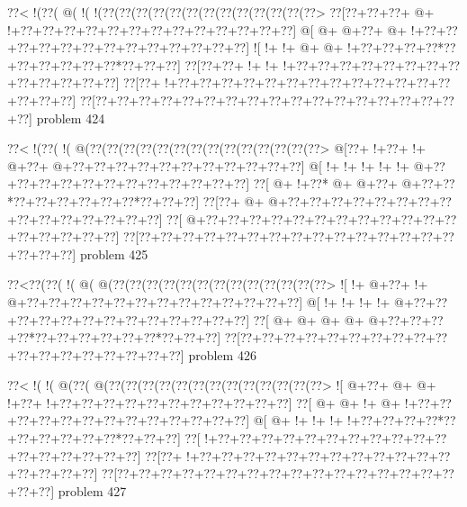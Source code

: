 \vbox{\vbox{\goo
\0??<\- !(\0??(\- @(\- !(\- !(\0??(\0??(\0??(\0??(\0??(\0??(\0??(\0??(\0??(\0??(\0??(\0??(\0??>
\0??[\0??+\0??+\0??+\- @+\- !+\0??+\0??+\0??+\0??+\0??+\0??+\0??+\0??+\0??+\0??+\0??+\0??+\0??]
\- @[\- @+\- @+\0??+\- @+\- !+\0??+\0??+\0??+\0??+\0??+\0??+\0??+\0??+\0??+\0??+\0??+\0??+\0??]
\- ![\- !+\- !+\- @+\- @+\- !+\0??+\0??+\0??+\0??*\0??+\0??+\0??+\0??+\0??+\0??*\0??+\0??+\0??]
\0??[\0??+\0??+\- !+\- !+\- !+\0??+\0??+\0??+\0??+\0??+\0??+\0??+\0??+\0??+\0??+\0??+\0??+\0??]
\0??[\0??+\- !+\0??+\0??+\0??+\0??+\0??+\0??+\0??+\0??+\0??+\0??+\0??+\0??+\0??+\0??+\0??+\0??]
\0??[\0??+\0??+\0??+\0??+\0??+\0??+\0??+\0??+\0??+\0??+\0??+\0??+\0??+\0??+\0??+\0??+\0??+\0??]
}
\hfil problem 424\hfil\break
}



\vbox{\vbox{\goo
\0??<\- !(\0??(\- !(\- @(\0??(\0??(\0??(\0??(\0??(\0??(\0??(\0??(\0??(\0??(\0??(\0??(\0??(\0??>
\- @[\0??+\- !+\0??+\- !+\- @+\0??+\- @+\0??+\0??+\0??+\0??+\0??+\0??+\0??+\0??+\0??+\0??+\0??]
\- @[\- !+\- !+\- !+\- !+\- !+\- @+\0??+\0??+\0??+\0??+\0??+\0??+\0??+\0??+\0??+\0??+\0??+\0??]
\0??[\- @+\- !+\0??*\- @+\- @+\0??+\- @+\0??+\0??*\0??+\0??+\0??+\0??+\0??+\0??*\0??+\0??+\0??]
\0??[\0??+\- @+\- @+\0??+\0??+\0??+\0??+\0??+\0??+\0??+\0??+\0??+\0??+\0??+\0??+\0??+\0??+\0??]
\0??[\- @+\0??+\0??+\0??+\0??+\0??+\0??+\0??+\0??+\0??+\0??+\0??+\0??+\0??+\0??+\0??+\0??+\0??]
\0??[\0??+\0??+\0??+\0??+\0??+\0??+\0??+\0??+\0??+\0??+\0??+\0??+\0??+\0??+\0??+\0??+\0??+\0??]
}
\hfil problem 425\hfil\break
}



\vbox{\vbox{\goo
\0??<\0??(\0??(\- !(\- @(\- @(\0??(\0??(\0??(\0??(\0??(\0??(\0??(\0??(\0??(\0??(\0??(\0??(\0??>
\- ![\- !+\- @+\0??+\- !+\- @+\0??+\0??+\0??+\0??+\0??+\0??+\0??+\0??+\0??+\0??+\0??+\0??+\0??]
\- @[\- !+\- !+\- !+\- !+\- @+\0??+\0??+\0??+\0??+\0??+\0??+\0??+\0??+\0??+\0??+\0??+\0??+\0??]
\0??[\- @+\- @+\- @+\- @+\- @+\0??+\0??+\0??+\0??*\0??+\0??+\0??+\0??+\0??+\0??*\0??+\0??+\0??]
\0??[\0??+\0??+\0??+\0??+\0??+\0??+\0??+\0??+\0??+\0??+\0??+\0??+\0??+\0??+\0??+\0??+\0??+\0??]
}
\hfil problem 426\hfil\break
}



\vbox{\vbox{\goo
\0??<\- !(\- !(\- @(\0??(\- @(\0??(\0??(\0??(\0??(\0??(\0??(\0??(\0??(\0??(\0??(\0??(\0??(\0??>
\- ![\- @+\0??+\- @+\- @+\- !+\0??+\- !+\0??+\0??+\0??+\0??+\0??+\0??+\0??+\0??+\0??+\0??+\0??]
\0??[\- @+\- @+\- !+\- @+\- !+\0??+\0??+\0??+\0??+\0??+\0??+\0??+\0??+\0??+\0??+\0??+\0??+\0??]
\- @[\- @+\- !+\- !+\- !+\- !+\0??+\0??+\0??+\0??*\0??+\0??+\0??+\0??+\0??+\0??*\0??+\0??+\0??]
\0??[\- !+\0??+\0??+\0??+\0??+\0??+\0??+\0??+\0??+\0??+\0??+\0??+\0??+\0??+\0??+\0??+\0??+\0??]
\0??[\0??+\- !+\0??+\0??+\0??+\0??+\0??+\0??+\0??+\0??+\0??+\0??+\0??+\0??+\0??+\0??+\0??+\0??]
\0??[\0??+\0??+\0??+\0??+\0??+\0??+\0??+\0??+\0??+\0??+\0??+\0??+\0??+\0??+\0??+\0??+\0??+\0??]
}
\hfil problem 427\hfil\break
}



